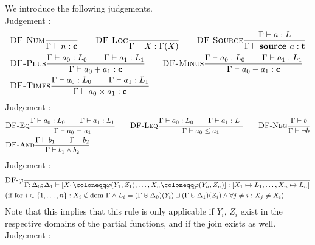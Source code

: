 We introduce the following judgements.
\\
Judgement :
\begin{align*}
    &\textsc{DF-Num}\frac{\displaystyle }{\displaystyle \Gamma \vdash {n}: \textbf{c}}\qquad
    \textsc{DF-Loc}\frac{\displaystyle }{\displaystyle \Gamma \vdash {X}: \Gamma(X)}\qquad
    \textsc{DF-Source}\frac{\displaystyle \Gamma \vdash {a}: L}{\displaystyle \Gamma \vdash {\textbf{source }{a}}: \textbf{t}}\\
    &\textsc{DF-Plus}\frac{\displaystyle \Gamma \vdash {a_0}: L_0\qquad\Gamma \vdash {a_1}: L_1}{\displaystyle \Gamma \vdash {a_0+a_1}: \textbf{c}}\qquad
    \textsc{DF-Minus}\frac{\displaystyle \Gamma \vdash {a_0}: L_0\qquad\Gamma \vdash {a_1}: L_1}{\displaystyle \Gamma \vdash {a_0-a_1}: \textbf{c}}\\
    &\textsc{DF-Times}\frac{\displaystyle \Gamma \vdash {a_0}: L_0\qquad\Gamma \vdash {a_1}: L_1}{\displaystyle \Gamma \vdash {a_0 \times a_1}: \textbf{c}}
\end{align*}
Judgement :
\begin{align*}
    &\textsc{DF-Eq}\frac{\displaystyle \Gamma \vdash {a_0}: L_0\qquad \Gamma \vdash {a_1}: L_1}{\displaystyle \Gamma \vdash {a_0 = a_1}}\qquad
    \textsc{DF-Leq}\frac{\displaystyle \Gamma \vdash {a_0}: L_0\qquad \Gamma \vdash {a_1}: L_1}{\displaystyle \Gamma \vdash {a_0 \leq a_1}}\qquad
    \textsc{DF-Neg}\frac{\displaystyle \Gamma \vdash {b}}{\displaystyle \Gamma \vdash {\neg b}}\\
    &\textsc{DF-And}\frac{\displaystyle \Gamma \vdash {b_1}\qquad\Gamma \vdash {b_2}}{\displaystyle \Gamma \vdash {b_1 \land b_2}}\\
\end{align*}
Judgement :
\begin{align*}
    &\rule{DF-$\varphi$}{}{\typestep{\Gamma;\Delta_0;\Delta_1}{\defaultphilistn}{[X_1 \mapsto L_1, \ldots, X_n \mapsto L_n]}}\\
    &\text{(if for $i \in \{1, \ldots, n\}: X_i \notin \dom\Gamma \land L_i = (\Gamma \dunion \Delta_0)(Y_i) \join (\Gamma \dunion \Delta_1)(Z_i)
    \land \forall j \neq i: X_j \neq X_i$)}
\end{align*}
Note that this implies that this rule is only applicable if $Y_i$, $Z_i$ exist in the respective
domains of the partial functions, and if the join exists as well.\\
Judgement :
